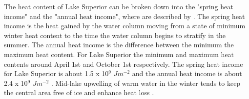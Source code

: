 
The heat content of Lake Superior can be broken down into the "spring heat income" and  the "annual heat income", where are described by \citep{bennett_1978}.  The spring heat income is the
heat gained by the water column moving from a state of minimum winter heat content to the time the water column begins to stratify in the summer. The annual heat income is the difference 
between the minimum the maximum heat content. For Lake Superior the minimum and maximum heat contents around April 1st and October 1st respectively. The spring heat income for 
Lake Superior is about 1.5 x 10$^{9}$ $Jm^{-2}$ and the annual heat income is about 2.4 x 10$^{9}$ $Jm^{-2}$ \citep{titze_thesis}. Mid-lake upwelling of warm water in the winter tends to keep the central area free of ice and enhance heat loss \citep{bennett_1978}. 



